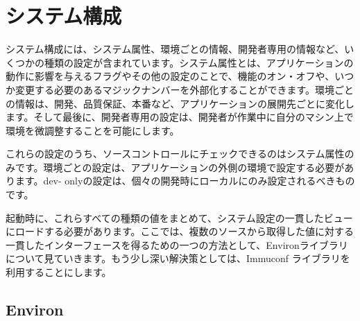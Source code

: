 \section{システム構成}

システム構成には、システム属性、環境ごとの情報、開発者専用の情報など、いくつかの種類の設定が含まれています。システム属性とは、アプリケーションの動作に影響を与えるフラグやその他の設定のことで、機能のオン・オフや、いつか変更する必要のあるマジックナンバーを外部化することができます。環境ごとの情報は、開発、品質保証、本番など、アプリケーションの展開先ごとに変化します。そして最後に、開発者専用の設定は、開発者が作業中に自分のマシン上で環境を微調整することを可能にします。

これらの設定のうち、ソースコントロールにチェックできるのはシステム属性のみです。環境ごとの設定は、アプリケーションの外側の環境で設定する必要があります。dev- onlyの設定は、個々の開発時にローカルにのみ設定されるべきものです。

起動時に、これらすべての種類の値をまとめて、システム設定の一貫したビューにロードする必要があります。ここでは、複数のソースから取得した値に対する一貫したインターフェースを得るための一つの方法として、Environライブラリについて見ていきます。もう少し深い解決策としては、Immuconf ライブラリを利用することにします。

\subsection{Environ}







